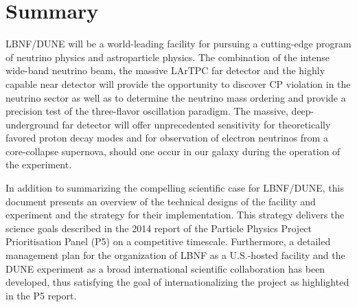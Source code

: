 

\chapter{Summary}
\label{ch:project-summary}

LBNF/DUNE will be a world-leading facility for pursuing a cutting-edge program of neutrino physics and astroparticle physics. The 
combination of the intense wide-band neutrino beam, the massive LArTPC far detector and the highly capable near detector will provide 
the opportunity to discover CP violation in the neutrino sector as well as to determine the neutrino mass ordering and provide a 
precision test of the three-flavor oscillation paradigm. The massive, deep-underground far detector will offer unprecedented sensitivity for %
theoretically favored proton decay modes %
and for observation of electron neutrinos from a core-collapse supernova, should one occur in our galaxy during the operation of the experiment.

In addition to summarizing the compelling scientific case for LBNF/DUNE, this document presents an overview of the technical 
designs of the facility and experiment and the strategy for their implementation. 
This strategy delivers the science goals described in the 2014 report of the Particle Physics Project Prioritisation Panel (P5) on a 
competitive timescale. Furthermore, a detailed management plan for the 
organization of LBNF as a U.S.-hosted facility and the DUNE experiment 
as a broad international scientific collaboration has been developed, thus satisfying the goal of internationalizing the project as highlighted in the 
P5 report.

